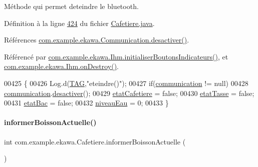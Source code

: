 Méthode qui permet d\textquotesingle{}eteindre le bluetooth. 



Définition à la ligne \hyperlink{_cafetiere_8java_source_l00424}{424} du fichier \hyperlink{_cafetiere_8java_source}{Cafetiere.\+java}.



Références \hyperlink{_communication_8java_source_l00237}{com.\+example.\+ekawa.\+Communication.\+desactiver()}.



Référencé par \hyperlink{_ihm_8java_source_l00357}{com.\+example.\+ekawa.\+Ihm.\+initialiser\+Boutons\+Indicateurs()}, et \hyperlink{_ihm_8java_source_l00315}{com.\+example.\+ekawa.\+Ihm.\+on\+Destroy()}.


\begin{DoxyCode}
00425     \{
00426         Log.d(\hyperlink{classcom_1_1example_1_1ekawa_1_1_cafetiere_aa0c1fd99a2508b06c462aea17034aa91}{TAG},\textcolor{stringliteral}{"eteindre()"});
00427         \textcolor{keywordflow}{if}(\hyperlink{classcom_1_1example_1_1ekawa_1_1_cafetiere_af9506a7805d000d2cb83444cdb8ea889}{communication} != null)
00428             \hyperlink{classcom_1_1example_1_1ekawa_1_1_cafetiere_af9506a7805d000d2cb83444cdb8ea889}{communication}.\hyperlink{classcom_1_1example_1_1ekawa_1_1_communication_a230dde1900a47e26832b7467eddc556a}{desactiver}();
00429         \hyperlink{classcom_1_1example_1_1ekawa_1_1_cafetiere_ae170dd018d1e740b3bda080d1cc3d900}{etatCafetiere} = \textcolor{keyword}{false};
00430         \hyperlink{classcom_1_1example_1_1ekawa_1_1_cafetiere_a93c5021591facf06397e760c11556904}{etatTasse} = \textcolor{keyword}{false};
00431         \hyperlink{classcom_1_1example_1_1ekawa_1_1_cafetiere_a058f7a18cd9c0567d583b8bc6250d143}{etatBac} = \textcolor{keyword}{false};
00432         \hyperlink{classcom_1_1example_1_1ekawa_1_1_cafetiere_aaf8e1a960f803c2de4defa414b5984a4}{niveauEau} = 0;
00433     \}
\end{DoxyCode}
\mbox{\label{classcom_1_1example_1_1ekawa_1_1_cafetiere_aa7022512d5a36d2b911722ae6400379f}} 
\paragraph{\texorpdfstring{informer\+Boisson\+Actuelle()}{informerBoissonActuelle()}}
{\footnotesize\ttfamily int com.\+example.\+ekawa.\+Cafetiere.\+informer\+Boisson\+Actuelle (\begin{DoxyParamCaption}{ }\end{DoxyParamCaption})}



